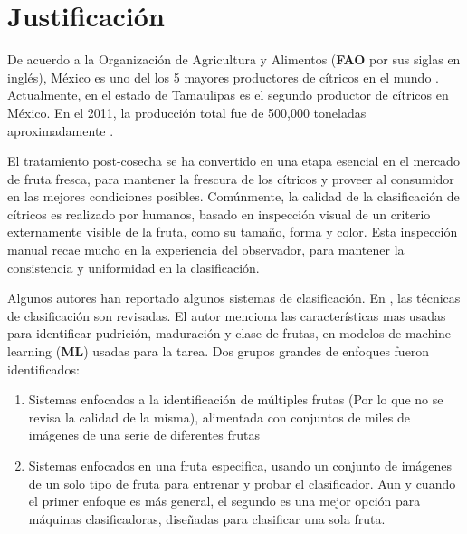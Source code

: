 \documentclass[twoside,spanish,ESP,MSc]{plantillaLabUPV}
\theoremstyle{definition}
\begin{document}
\section{Justificación}



De acuerdo a la Organización de Agricultura y Alimentos (\textbf{FAO} por sus siglas en inglés), México es uno del los 5 mayores productores de cítricos en el mundo \cite{FAO_2016}. Actualmente, en el estado de Tamaulipas es el segundo productor de cítricos en México. En el 2011, la producción total fue de 500,000 toneladas aproximadamente \cite{sag}.

El tratamiento post-cosecha se ha convertido en una etapa esencial en el mercado de fruta fresca, para mantener la frescura de los cítricos y proveer al consumidor en las mejores condiciones posibles. Comúnmente, la calidad de la clasificación de cítricos es realizado por humanos, basado en inspección visual de un criterio externamente visible de la fruta, como su tamaño, forma y color. Esta inspección manual recae mucho en la experiencia del observador, para mantener la consistencia y uniformidad en la clasificación. 

Algunos autores han reportado algunos sistemas de clasificación. En \cite{7306754}, las técnicas de clasificación son revisadas. El autor menciona las características mas usadas para identificar pudrición, maduración y clase de frutas, en modelos de machine learning (\textbf{ML}) usadas para la tarea. Dos grupos grandes de enfoques fueron identificados: 


\begin{enumerate}
\itemsep 0em
 \item Sistemas enfocados a la identificación de múltiples frutas (Por lo que no se revisa la calidad de la misma), alimentada con conjuntos de miles de imágenes de una serie de diferentes frutas 
 \item Sistemas enfocados en una fruta especifica, usando un conjunto de imágenes de un solo tipo de fruta para entrenar y probar el clasificador. Aun y cuando el primer enfoque es más general, el segundo es una mejor opción para máquinas clasificadoras, diseñadas para clasificar una sola fruta.
\end{enumerate}
\end{document}
